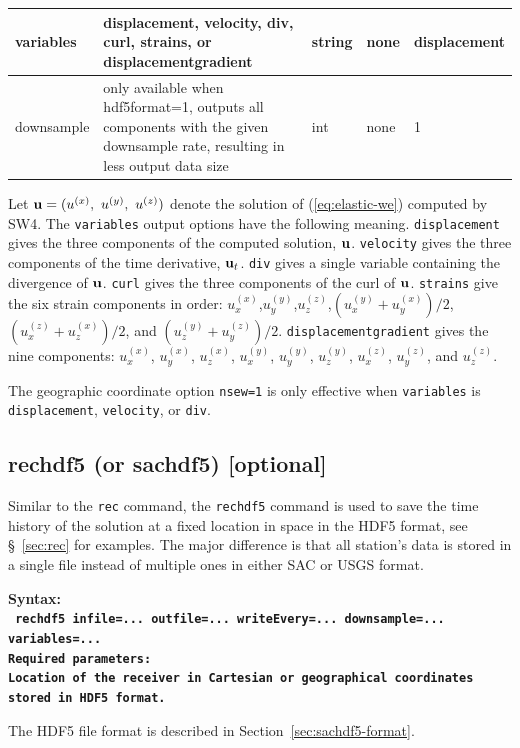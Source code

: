 \documentclass[11pt]{report}
\begin{document}
{\begin{center}
\begin{tabular}{|l|p{8cm}|l|l|l|}
		variables   & displacement, velocity, div, curl, strains, or displacementgradient                                                         & string    & none       & displacement   \\ \hline
		downsample  & only available when hdf5format=1, outputs all components with the given downsample rate, resulting in less output data size & int       & none       & 1              \\ \hline
	\end{tabular}
\end{center}
Let ${\bf u}=(u^{(x)},\ u^{(y)},\ u^{(z)})$ denote the solution of (\ref{eq:elastic-we}) computed by SW4.
The {\tt variables} output options have the following meaning. {\tt displacement} gives the three components of the computed solution, ${\bf u}$. {\tt velocity} gives the three components of the time derivative, ${\bf u}_t$. {\tt div} gives a single variable containing the divergence of ${\bf u}$. {\tt curl} gives the three components of the curl of ${\bf u}$. {\tt strains} give the six strain components in order: $u^{(x)}_x$,$u^{(y)}_y$,$u^{(z)}_z$,$(u^{(y)}_x+u^{(x)}_y)/2$, $(u^{(z)}_x+u^{(x)}_z)/2$, and
$(u^{(y)}_z+u^{(z)}_y)/2$. {\tt displacementgradient} gives the nine components: $u^{(x)}_x$, $u^{(x)}_y$, $u^{(x)}_z$,
$u^{(y)}_x$, $u^{(y)}_y$, $u^{(y)}_z$, $u^{(z)}_x$, $u^{(z)}_y$, and $u^{(z)}_z$. \par

The geographic coordinate option {\tt nsew=1} is only effective when {\tt variables} is
	{\tt displacement}, {\tt velocity}, or {\tt div}.



\subsection{rechdf5 (or sachdf5) [optional]}
Similar to the \verb+rec+ command, the \verb+rechdf5+ command is used to save the time history of the solution at a fixed location in
space in the HDF5 format, see \S~\ref{sec:rec} for examples. The major difference is that all station's data is stored in a single
file instead of multiple ones in either SAC or USGS format.
\begin{flushleft}
	\bf
	Syntax:\\
	\tt
	rechdf5 infile=... outfile=... writeEvery=... downsample=... variables=...
	\\
	\bf Required parameters:\\
	\rm Location of the receiver in Cartesian or geographical coordinates stored in HDF5 format.
\end{flushleft}
%
The HDF5 file format is described in Section~\ref{sec:sachdf5-format}.
%

}
\end{document}
